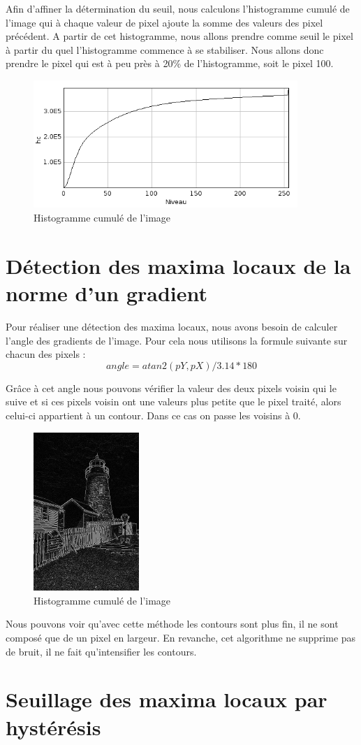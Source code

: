\documentclass[a4paper,11pt]{article}
\begin{document}
  Afin d'affiner la détermination du seuil, nous calculons l'histogramme cumulé de l'image qui à chaque valeur
  de pixel ajoute la somme des valeurs des pixel précédent. A partir de cet histogramme, nous allons prendre
  comme seuil le pixel à partir du quel l'histogramme commence à se stabiliser. Nous allons donc prendre le pixel
  qui est à peu près à 20\% de l'histogramme, soit le pixel 100.
  
  \begin{figure}[H]
  \center
   \includegraphics[width=10cm]{../histoCumul.png}
   \caption{Histogramme cumulé de l'image}
  \end{figure}
  
  \section{Détection des maxima locaux de la norme d'un gradient}
  Pour réaliser une détection des maxima locaux, nous avons besoin de calculer l'angle des gradients
  de l'image. Pour cela nous utilisons la formule suivante sur chacun des pixels : \\
  $$angle = atan2(pY, pX)/3.14*180$$
  
  Grâce à cet angle nous pouvons vérifier la valeur des deux pixels voisin qui le suive et si ces pixels
  voisin ont une valeurs plus petite que le pixel traité, alors celui-ci appartient à un contour.
  Dans ce cas on passe les voisins à 0.\\
  
  \begin{figure}[H]
  \center
   \includegraphics[width=4cm]{../maxima_locaux.png}
   \caption{Histogramme cumulé de l'image}
  \end{figure}
  
  Nous pouvons voir qu'avec cette méthode les contours sont plus fin, il ne sont composé que de un pixel
  en largeur. En revanche, cet algorithme ne supprime pas de bruit, il ne fait qu'intensifier les contours.
  
  \section{Seuillage des maxima locaux par hystérésis}
\end{document}
